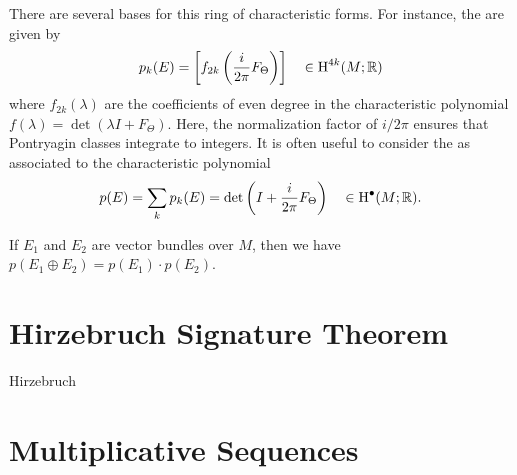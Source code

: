 There are several bases for this ring of characteristic forms. For instance, the  are given by
\[
  p_k(E) = \left[f_{2k}\left(\frac{i}{2\pi}F_\Theta\right)\right]\quad\in\operatorname{H}^{4k}(M; \mathbb{R})
\]
where $f_{2k}(\lambda)$ are the coefficients of even degree in the characteristic polynomial $f(\lambda) = \det(\lambda I+F_\Theta)$. Here, the normalization factor of $i/2\pi$ ensures that Pontryagin classes integrate to integers. It is often useful to consider the  as associated to the characteristic polynomial
\[
  p(E) = \sum_k p_k(E) = \det\left(I + \frac{i}{2\pi} F_\Theta\right) \quad\in \operatorname{H}^\bullet(M; \mathbb{R}).
\]
\begin{proposition} If $E_1$ and $E_2$ are vector bundles over $M$, then we have $p(E_1\oplus E_2) = p(E_1)\cdot p(E_2)$.
\end{proposition}

\begin{theorem}\label{thm:chern-simons}
\end{theorem}

\section{Hirzebruch Signature Theorem}

\begin{theorem}{Hirzebruch}\label{thm:hirzebruch_signature}
\end{theorem}

\section{Multiplicative Sequences}\label{sec:multiplicative_sequences}

